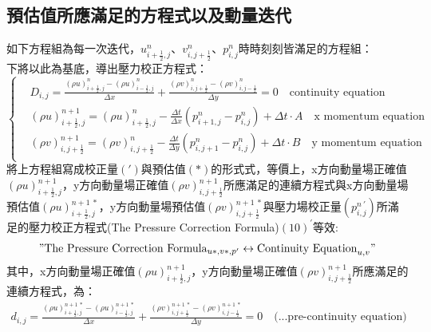 \documentclass[12pt]{article}
\begin{document}
\subsection{預估值所應滿足的方程式以及動量迭代}
\noindent 如下方程組為每一次迭代，$u_{i+\frac{1}{2},j}^{n}$、$v_{i,j+\frac{1}{2}}^{n}$、$p_{i,j}^{n}$時時刻刻皆滿足的方程組：\\
\noindent 下將以此為基底，導出壓力校正方程式：\\
\begin{equation}
\left\{
\begin{aligned}
    &D_{i,j} = \frac{(\rho u)_{i+\frac{1}{2},j}^{n} - (\rho u)_{i-\frac{1}{2},j}^{n}}{\Delta x} + \frac{(\rho v)_{i,j+\frac{1}{2}}^{n} - (\rho v)_{i,j-\frac{1}{2}}^{n}}{\Delta y} = 0 \quad \text{continuity equation}\\[1.5ex]
    &(\rho u)_{i+\frac{1}{2},j}^{n+1} = (\rho u)_{i+\frac{1}{2},j}^{n} - \frac{\Delta t}{\Delta x}(p_{i+1,j}^{n} - p_{i,j}^{n}) + \Delta t \cdot A  \quad \text{x momentum equation}\\[1.5ex]
    &(\rho v)_{i,j+\frac{1}{2}}^{n+1} = (\rho v)_{i,j+\frac{1}{2}}^{n} - \frac{\Delta t}{\Delta y}(p_{i,j+1}^{n} - p_{i,j}^{n}) + \Delta t \cdot B \quad \text{y momentum equation}\\[1.5ex]
\end{aligned}
\right.
\end{equation}
\noindent 將上方程組寫成校正量$(')$與預估值$(*)$的形式式，等價上，x方向動量場正確值$(\rho u)_{i+\frac{1}{2},j}^{n+1}$，y方向動量場正確值$(\rho v)_{i,j+\frac{1}{2}}^{n+1}$所應滿足的連續方程式與x方向動量場預估值$(\rho u)_{i+\frac{1}{2},j}^{n+1\ *}$，y方向動量場預估值$(\rho v)_{i,j+\frac{1}{2}}^{n+1\ *}$與壓力場校正量$(p_{i,j}^{n\ \prime})$所滿足的壓力校正方程式(The Pressure Correction Formula)$(10)^{\prime}$等效:\\
$$" \text{The Pressure Correction Formula}_{u*,v*,p'} \leftrightarrow \text{Continuity Equation}_{u,v}"$$
\noindent 其中，x方向動量場正確值$(\rho u)_{i+\frac{1}{2},j}^{n+1}$，y方向動量場正確值$(\rho v)_{i,j+\frac{1}{2}}^{n+1}$所應滿足的連續方程式，為：
\begin{equation}\begin{split}
    d_{i,j} = \frac{(\rho u)_{i+\frac{1}{2},j}^{n+1\ *} - (\rho u)_{i-\frac{1}{2},j}^{n+1\ *}}{\Delta x} + \frac{(\rho v)_{i,j+\frac{1}{2}}^{n+1\ *} - (\rho v)_{i,j-\frac{1}{2}}^{n+1\ *}}{\Delta y} = 0 \quad \text{(...pre-continuity equation)}\\[1.5ex]
\end{split}\end{equation}
\end{document}

